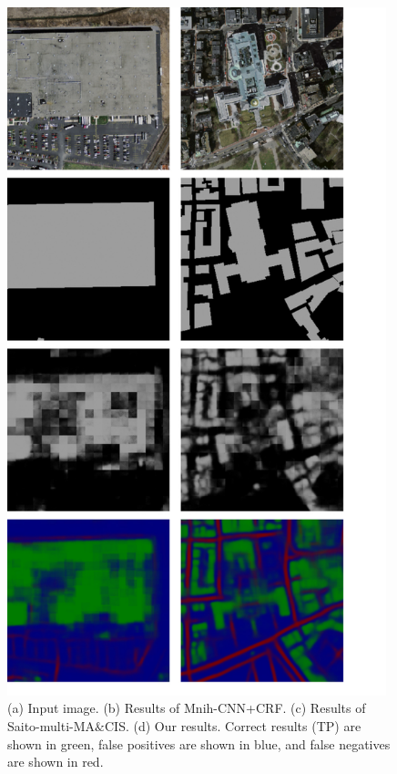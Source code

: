 \documentclass[runningheads]{llncs}
\begin{document}
\begin{figure}
\centering
\includegraphics[width=110mm]{ComparedResults}
\caption{(a) Input image. (b) Results of Mnih-CNN+CRF\cite{Mnih2013Machine}. (c) Results of Saito-multi-MA$\&$CIS\cite{Saito2016Multiple}. (d) Our results. 
Correct results (TP) are shown in green, false positives are shown in blue, and false negatives are shown in red.}
\label{fig:ComparedResults}
\end{figure}

\end{document}
